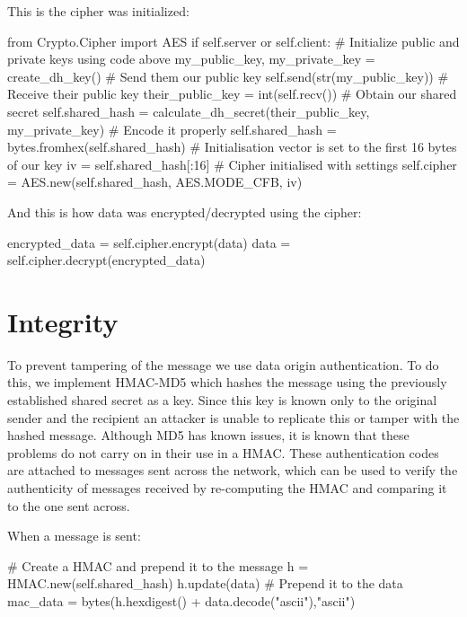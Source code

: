 \documentclass[9pt,a4paper]{article}
\begin{document}
This is the cipher was initialized:
\begin{center}
\vspace{-2ex}
\begin{python}
from Crypto.Cipher import AES
if self.server or self.client:
    # Initialize public and private keys using code above
    my_public_key, my_private_key = create_dh_key()
    # Send them our public key
    self.send(str(my_public_key))
    # Receive their public key
    their_public_key = int(self.recv())
    # Obtain our shared secret
    self.shared_hash = calculate_dh_secret(their_public_key, my_private_key)
    # Encode it properly
    self.shared_hash = bytes.fromhex(self.shared_hash)
# Initialisation vector is set to the first 16 bytes of our key
iv = self.shared_hash[:16]
# Cipher initialised with settings
self.cipher = AES.new(self.shared_hash, AES.MODE_CFB, iv)
\end{python}
\end{center}
And this is how data was encrypted/decrypted using the cipher:
\begin{center}
\vspace{-2ex}
\begin{python}
encrypted_data = self.cipher.encrypt(data)
data = self.cipher.decrypt(encrypted_data)
\end{python}\end{center}

\section{Integrity}
\vspace{-2ex}
To prevent tampering of the message we use data origin authentication. To do this, we implement HMAC-MD5 which hashes the message using the previously established shared secret as a key. Since this key is known only to the original sender and the recipient an attacker is unable to replicate this or tamper with the hashed message. Although MD5 has known issues, it is known that these problems do not carry on in their use in a HMAC. These authentication codes are attached to messages sent across the network, which can be used to verify the authenticity of messages received by re-computing the HMAC and comparing it to the one sent across.

When a message is sent:
\begin{center}
\vspace{-2ex}
\begin{python}
# Create a HMAC and prepend it to the message
h = HMAC.new(self.shared_hash)
h.update(data)
# Prepend it to the data
mac_data = bytes(h.hexdigest() + data.decode("ascii"),"ascii")
\end{python}\end{center}
\end{document}
